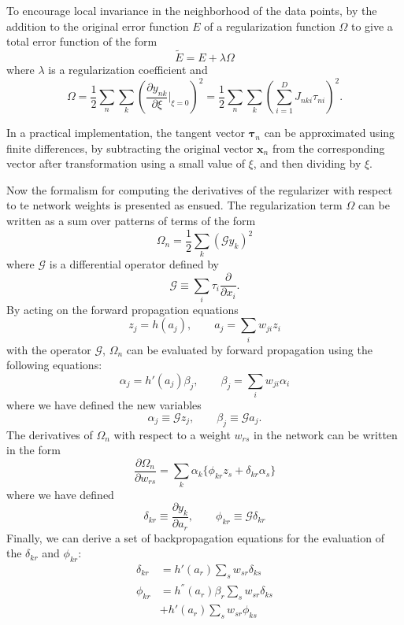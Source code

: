 \documentclass[a4paper]{report}
\renewcommand{\bf}{\mathbf}
\renewcommand{\cal}{\mathcal}
\newcommand{\bs}{\boldsymbol}
\begin{document}
To encourage local invariance in the neighborhood of the data points, by the addition to the original error function $E$ of a regularization function $\Omega$ to give a total error function of the form
\begin{equation}
	\tilde{E} = E + \lambda \Omega
\end{equation}
where $\lambda$ is a regularization coefficient and
\begin{equation}
	\Omega = \frac{1}{2} \sum_n \sum_k \left(\frac{\partial y_{nk}}{\partial \xi}\bigg|_{\xi = 0} \right)^2 =\frac{1}{2} \sum_n \sum_k \left(\sum_{i=1}^{D}J_{nki}\tau_{ni}\right)^2.
\end{equation}

In a practical implementation, the tangent vector $\bs{\tau}_n$ can be approximated using finite differences, by subtracting the original vector $\bf{x}_n$ from the corresponding vector after transformation using a small value of $\xi$, and then dividing by $\xi$.

Now the formalism for computing the derivatives of the regularizer with respect to te network weights is presented as ensued. The regularization term $\Omega$ can be written as a sum over patterns of terms of the form
\begin{equation}
	\Omega_n = \frac{1}{2} \sum_k (\cal{G}y_k)^2
\end{equation}
where $\cal{G}$ is a differential operator defined by 
\begin{equation}
	\cal{G} \equiv \sum_i \tau_i \frac{\partial}{\partial x_i}.
\end{equation}
By acting on the forward propagation equations
\begin{equation}
	z_j = h(a_j), \qquad a_j = \sum_i w_{ji}z_i
\end{equation}
with the operator $\cal{G}$, $\Omega_n$  can be evaluated by forward propagation using the following equations:
\begin{equation}
	\alpha_j = h'(a_j) \beta_j , \qquad \beta_j = \sum_i w_{ji} \alpha_i
\end{equation}
where we have defined the new variables
\begin{equation}
	\alpha_j \equiv \cal{G} z_j, \qquad \beta_j \equiv \cal{G} a_j.
\end{equation}
The derivatives of $\Omega_n$ with respect to a weight $w_{rs}$ in the network can be written in the form
\begin{equation}
	\frac{\partial \Omega_n}{\partial w_{rs}} = \sum_k \alpha_k \{\phi_{kr}z_s + \delta_{kr}\alpha_s  \}
\end{equation}
where we have defined
\begin{equation}
	\delta_{kr} \equiv \frac{\partial y_k}{\partial a_r}, \qquad \phi_{kr} \equiv \cal{G} \delta_{kr}
\end{equation}
Finally, we can derive a set of backpropagation equations for the evaluation of the $\delta_{kr}$ and $\phi_{kr}$:
\begin{align}
	\delta_{kr} &= h'(a_r) \sum_s w_{sr} \delta_{ks}\\
	\phi_{kr} &= h^{''}(a_r) \beta_r \sum_s w_{sr} \delta_{ks} \\
	& + h'(a_r) \sum_s w_{sr} \phi_{ks}
\end{align}
\end{document}
